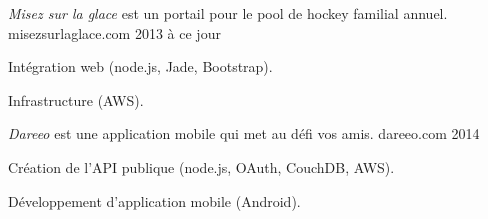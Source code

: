 
\begin{cventries}

  \cventry
    {\textit{Misez sur la glace} est un portail pour le pool de hockey familial annuel.} %
    {misezsurlaglace.com} %
    {} %
    {2013 à ce jour} %
    {
      \begin{cvitems} %
        \item {Intégration web (node.js, Jade, Bootstrap).}
        \item {Infrastructure (AWS).}
      \end{cvitems}
    }

  \cventry
    {\textit{Dareeo} est une application mobile qui met au défi vos amis.} %
    {dareeo.com} %
    {} %
    {2014} %
    {
      \begin{cvitems} %
        \item {Création de l’API publique (node.js, OAuth, CouchDB, AWS).}
        \item {Développement d’application mobile (Android).}
      \end{cvitems}
    }


\end{cventries}